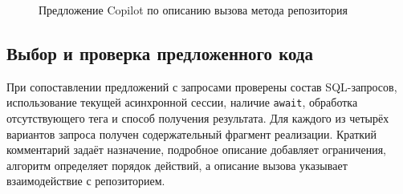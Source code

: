 \begin{figure}[H]
	\centering
	\caption{Предложение Copilot по описанию вызова метода репозитория}
	\label{fig:copilot-call-request}
\end{figure}

\subsection{Выбор и проверка предложенного кода}

При сопоставлении предложений с запросами проверены состав SQL-запросов,
использование текущей асинхронной сессии, наличие \verb|await|,
обработка отсутствующего тега и способ получения результата.
Для каждого из четырёх вариантов запроса получен содержательный фрагмент
реализации. Краткий комментарий задаёт назначение, подробное описание
добавляет ограничения, алгоритм определяет порядок действий, а описание
вызова указывает взаимодействие с репозиторием.
